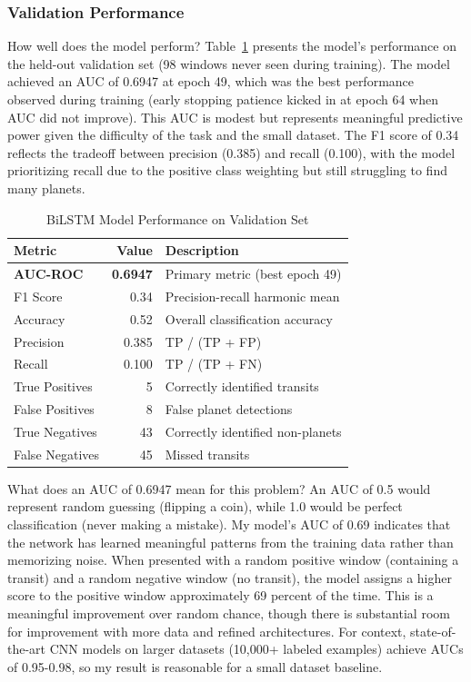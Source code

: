 \documentclass[letterpaper]{article} %
\begin{document}
\subsubsection{Validation Performance}

How well does the model perform? Table~\ref{tab:bilstm_performance} presents the model's performance on the held-out validation set (98 windows never seen during training). The model achieved an AUC of 0.6947 at epoch 49, which was the best performance observed during training (early stopping patience kicked in at epoch 64 when AUC did not improve). This AUC is modest but represents meaningful predictive power given the difficulty of the task and the small dataset. The F1 score of 0.34 reflects the tradeoff between precision (0.385) and recall (0.100), with the model prioritizing recall due to the positive class weighting but still struggling to find many planets.

\begin{table}[h]
\centering
\caption{BiLSTM Model Performance on Validation Set}
\label{tab:bilstm_performance}
\begin{tabular}{@{}lrl@{}}
\toprule
\textbf{Metric} & \textbf{Value} & \textbf{Description} \\
\midrule
\textbf{AUC-ROC} & \textbf{0.6947} & Primary metric (best epoch 49) \\
F1 Score & 0.34 & Precision-recall harmonic mean \\
Accuracy & 0.52 & Overall classification accuracy \\
Precision & 0.385 & TP / (TP + FP) \\
Recall & 0.100 & TP / (TP + FN) \\
True Positives & 5 & Correctly identified transits \\
False Positives & 8 & False planet detections \\
True Negatives & 43 & Correctly identified non-planets \\
False Negatives & 45 & Missed transits \\
\bottomrule
\end{tabular}
\end{table}

What does an AUC of 0.6947 mean for this problem? An AUC of 0.5 would represent random guessing (flipping a coin), while 1.0 would be perfect classification (never making a mistake). My model's AUC of 0.69 indicates that the network has learned meaningful patterns from the training data rather than memorizing noise. When presented with a random positive window (containing a transit) and a random negative window (no transit), the model assigns a higher score to the positive window approximately 69 percent of the time. This is a meaningful improvement over random chance, though there is substantial room for improvement with more data and refined architectures. For context, state-of-the-art CNN models on larger datasets (10,000+ labeled examples) achieve AUCs of 0.95-0.98, so my result is reasonable for a small dataset baseline.
\end{document}

